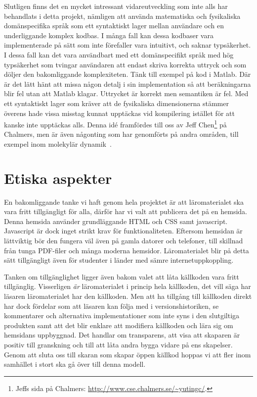 Slutligen finns det en mycket intressant vidareutveckling som inte alls har
behandlats i detta projekt, nämligen att använda matematiska och fysikaliska domänspecifika språk som
ett syntaktiskt lager mellan användare och en underliggande komplex kodbas. I
många fall kan dessa kodbaser vara implementerade på sätt som inte förefaller vara intuitivt, och saknar
typsäkerhet. I dessa fall kan det vara användbart med ett
domänspecifikt språk med hög typsäkerhet som tvingar användaren att
endast skriva korrekta uttryck och som döljer den bakomliggande komplexiteten. Tänk till exempel på kod i Matlab. Där är det lätt hänt att missa någon detalj i sin implementation så att beräkningarna blir fel utan att Matlab klagar. Uttrycket är korrekt men semantiken är fel. Med ett syntaktiskt lager som kräver att de fysikaliska dimensionerna stämmer överens hade vissa misstag kunnat upptäckas vid kompilering istället för att kanske inte upptäckas alls. Denna idé framfördes till oss av Jeff Chen\footnote{Jeffs sida på Chalmers:
\url{http://www.cse.chalmers.se/\~yutingc/}.}
på Chalmers, men är även någonting som har genomförts på andra områden, till
exempel inom molekylär dynamik~\cite{MD}.

\section{Etiska aspekter}

En bakomliggande tanke vi haft genom hela projektet är att läromaterialet ska
vara fritt tillgängligt för alla, därför har vi valt att publicera det på en
hemsida.  Denna hemsida använder grundläggande HTML och CSS samt javascript.
Javascript är dock inget strikt krav för funktionaliteten. Eftersom hemsidan är
lättviktig bör den fungera väl även på gamla datorer och telefoner, till
skillnad från tunga PDF-filer och många moderna hemsidor. Läromaterialet blir på
detta sätt tillgängligt även för studenter i länder med sämre
internetuppkoppling.

Tanken om tillgänglighet ligger även bakom valet att låta källkoden vara fritt
tillgänglig. Visserligen \textit{är} läromaterialet i princip hela källkoden, det vill säga
har läsaren läromaterialet har den källkoden. Men att ha tillgång till källkoden
direkt har dock fördelar som att läsaren kan följa med i versionshistoriken,
se kommentarer och alternativa implementationer som inte syns i den slutgiltiga
produkten samt att det blir enklare att modifiera källkoden och lära sig om
hemsidans uppbyggnad. Det handlar om transparens, att visa att skaparen är positiv till granskning
och till att låta andra bygga vidare på ens skapelser. Genom att
sluta oss till skaran som skapar öppen källkod hoppas vi att fler inom samhället
i stort ska gå över till denna modell.

